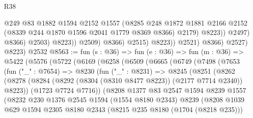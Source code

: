 \begin{lexlean}{R38}
\begin{coremodule}
                                    @249
                                    @83
                                    @1882
                                    @1594
                                    @2152
                                    @1557
                                    (@8285
                                      @248
                                      @1872
                                      @1881
                                      @2166
                                      @2152
                                      (@8339 @244 @1870 @1596 @2041 @1779 @8369 @8366)
                                      @2179)
                                    @8223))
                                @2497)
                              @8366)
                            @2503)
                          @8223))
                      @2509)
                    @8366)
                  @2515)
                @8223))
            @2521)
          @8366)
        @2527)
      @8223)
    @2532
@8563 := fun (s : @36) =>
  fun (e : @36) =>
  fun (m : @36) =>
  @5422
    (@5576
      (@5722
        (@6169
          (@6258
            (@6509
              (@6665
                (@6749
                  (@7498
                    (@7653
                      (fun ("_" : @7654) =>
                      @8230
                        (fun ("_" : @8231) =>
                        @8245
                          (@8251
                            (@8262
                              (@8278
                                (@8284
                                  (@8292 (@8304 (@8310 @8477 @8223)) (@2177 @7714 @2340))
                                  @8223))
                              (@1723 @7724 @7716))
                            (@8208
                              @1377
                              @83
                              @2547
                              @1594
                              @8239
                              @1557
                              (@8232
                                @230
                                @1376
                                @2545
                                @1594
                                (@1554 @8180 @2343)
                                @8239
                                (@8208
                                  @1039
                                  @629
                                  @1594
                                  @2305
                                  @8180
                                  @2343
                                  (@8215 @235 @8180 (@1704 (@8218 @235)))

\end{coremodule}
\end{lexlean}
